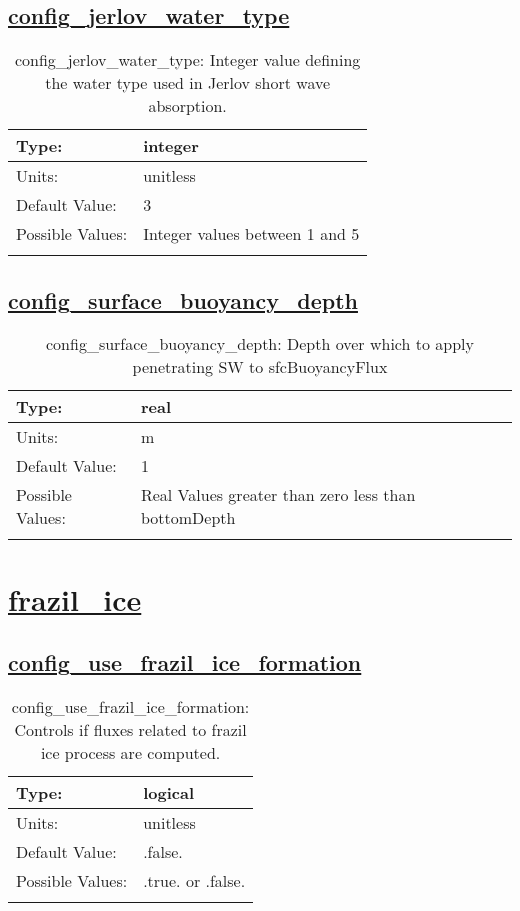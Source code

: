 \subsection[config\_jerlov\_water\_type]{\hyperref[sec:nm_tab_shortwaveRadiation]{config\_jerlov\_water\_type}}
\label{subsec:nm_sec_config_jerlov_water_type}
\begin{center}
\begin{longtable}{| p{2.0in} || p{4.0in} |}
    \hline
    Type: & integer \\
    \hline
    Units: & \si{unitless} \\
    \hline
    Default Value: & 3 \\
    \hline
    Possible Values: & Integer values between 1 and 5 \\
    \hline
    \caption{config\_jerlov\_water\_type: Integer value defining the water type used in Jerlov short wave absorption.}
\end{longtable}
\end{center}
\subsection[config\_surface\_buoyancy\_depth]{\hyperref[sec:nm_tab_shortwaveRadiation]{config\_surface\_buoyancy\_depth}}
\label{subsec:nm_sec_config_surface_buoyancy_depth}
\begin{center}
\begin{longtable}{| p{2.0in} || p{4.0in} |}
    \hline
    Type: & real \\
    \hline
    Units: & \si{m} \\
    \hline
    Default Value: & 1 \\
    \hline
    Possible Values: & Real Values greater than zero less than bottomDepth \\
    \hline
    \caption{config\_surface\_buoyancy\_depth: Depth over which to apply penetrating SW to sfcBuoyancyFlux}
\end{longtable}
\end{center}
\section[frazil\_ice]{\hyperref[sec:nm_tab_frazil_ice]{frazil\_ice}}
\label{sec:nm_sec_frazil_ice}
\subsection[config\_use\_frazil\_ice\_formation]{\hyperref[sec:nm_tab_frazil_ice]{config\_use\_frazil\_ice\_formation}}
\label{subsec:nm_sec_config_use_frazil_ice_formation}
\begin{center}
\begin{longtable}{| p{2.0in} || p{4.0in} |}
    \hline
    Type: & logical \\
    \hline
    Units: & \si{unitless} \\
    \hline
    Default Value: & .false. \\
    \hline
    Possible Values: & .true. or .false. \\
    \hline
    \caption{config\_use\_frazil\_ice\_formation: Controls if fluxes related to frazil ice process are computed.}
\end{longtable}
\end{center}
